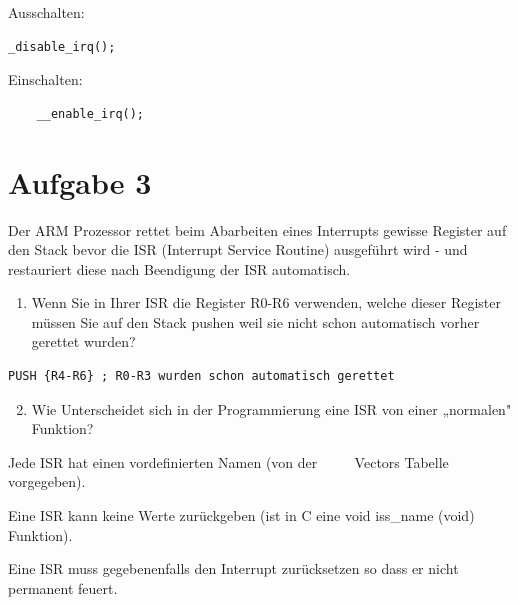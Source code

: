 Ausschalten:

\begin{verbatim}
_disable_irq();
\end{verbatim}

Einschalten:

\begin{verbatim}
    __enable_irq();
\end{verbatim}

\section*{Aufgabe 3}
Der ARM Prozessor rettet beim Abarbeiten eines Interrupts gewisse Register auf den Stack bevor die ISR (Interrupt Service Routine) ausgeführt wird - und restauriert diese nach Beendigung der ISR automatisch.

\begin{enumerate}
  \item Wenn Sie in Ihrer ISR die Register R0-R6 verwenden, welche dieser Register müssen Sie auf den Stack pushen weil sie nicht schon automatisch vorher gerettet wurden?
\end{enumerate}

\begin{verbatim}
PUSH {R4-R6} ; R0-R3 wurden schon automatisch gerettet
\end{verbatim}

\begin{enumerate}
  \setcounter{enumi}{1}
  \item Wie Unterscheidet sich in der Programmierung eine ISR von einer „normalen" Funktion?
\end{enumerate}

Jede ISR hat einen vordefinierten Namen (von der $\qquad$ Vectors Tabelle vorgegeben).

Eine ISR kann keine Werte zurückgeben (ist in C eine void iss\_name (void) Funktion).

Eine ISR muss gegebenenfalls den Interrupt zurücksetzen so dass er nicht permanent feuert.